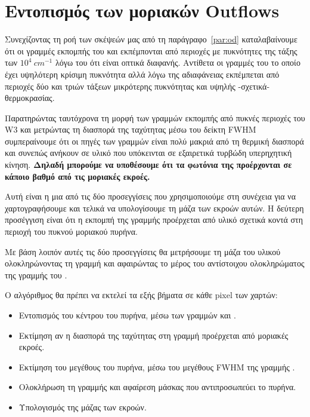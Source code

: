 \documentclass[a4paper,12pt]{memoir}
\begin{document}
\section{Εντοπισμός των μοριακών Outflows}
\label{par:Outflow-Trace}
Συνεχίζοντας τη ροή των σκέψεών μας από τη παράγραφο~\ref{par:od} καταλαβαίνουμε ότι οι γραμμές εκπομπής του  και  εκπέμπονται από περιοχές με πυκνότητες της τάξης των $10^4\ cm^{-1}$ λόγω του ότι είναι οπτικά διαφανής.
Αντίθετα οι γραμμές του  το οποίο έχει υψηλότερη κρίσιμη πυκνότητα αλλά λόγω της αδιαφάνειας εκπέμπεται από περιοχές δύο και τριών τάξεων μικρότερης πυκνότητας και υψηλής -σχετικά- θερμοκρασίας.

Παρατηρώντας ταυτόχρονα τη μορφή των γραμμών εκπομπής από πυκνές περιοχές του W3 και μετρώντας τη διασπορά της ταχύτητας μέσω του δείκτη FWHM συμπεραίνουμε ότι οι πηγές των γραμμών  είναι πολύ μακριά από τη θερμική διασπορά και συνεπώς ανήκουν σε υλικό που υπόκεινται σε εξαιρετικά τυρβώδη υπερηχητική κίνηση. \textbf{Δηλαδή μπορούμε να υποθέσουμε ότι τα φωτόνια της  προέρχονται σε κάποιο βαθμό από τις μοριακές εκροές.}
 
Αυτή είναι η μια από τις δύο προσεγγίσεις που χρησιμοποιούμε στη συνέχεια για να χαρτογραφήσουμε και τελικά να υπολογίσουμε τη μάζα των εκροών αυτών. Η δεύτερη προσέγγιση είναι ότι η εκπομπή της γραμμής  προέρχεται από υλικό σχετικά κοντά στη περιοχή του πυκνού μοριακού πυρήνα. 

Με βάση λοιπόν αυτές τις δύο προσεγγίσεις θα μετρήσουμε τη μάζα του υλικού ολοκληρώνοντας τη γραμμή  και αφαιρώντας το μέρος του αντίστοιχου ολοκληρώματος της γραμμής του .

Ο αλγόριθμος θα πρέπει να εκτελεί τα εξής βήματα σε κάθε pixel των χαρτών:
\begin{itemize}
	\item Εντοπισμός του κέντρου του πυρήνα, μέσω των γραμμών  και .
	\item Εκτίμηση αν η διασπορά της ταχύτητας στη γραμμή  προέρχεται από μοριακές εκροές.
	\item Εκτίμηση του μεγέθους του πυρήνα, μέσω του μεγέθους FWHM της γραμμής .
	\item Ολοκλήρωση τη γραμμής  και αφαίρεση μάσκας που αντιπροσωπεύει το πυρήνα. 
	\item Υπολογισμός της μάζας των εκροών. 
\end{itemize}
\end{document}
